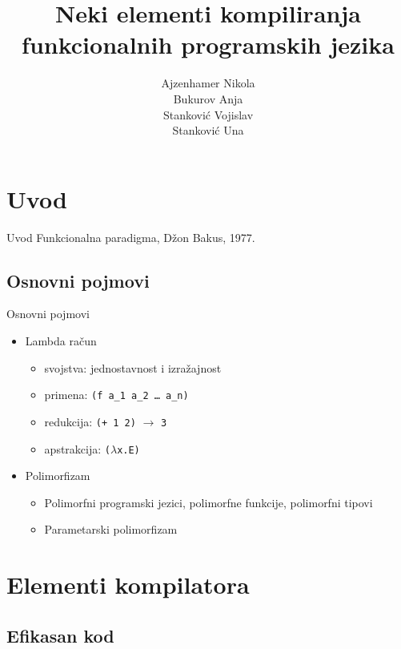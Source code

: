 \documentclass[xcolor={dvipsnames}, 11pt]{beamer}
\author{Ajzenhamer Nikola \\ Bukurov Anja \\ Stanković Vojislav \\ Stanković Una }
\title{Neki elementi kompiliranja funkcionalnih programskih jezika}
\begin{document}

\begin{frame}
	\titlepage
\end{frame}

\section{Uvod}

\begin{frame}{Uvod}
	Funkcionalna paradigma, Džon Bakus, 1977.\\
    \tableofcontents
\end{frame}

\subsection{Osnovni pojmovi}
	
\begin{frame}{Osnovni pojmovi}
	\begin{itemize}
    \item Lambda račun
    \begin{itemize}
    \item svojstva: jednostavnost i izražajnost
    \item primena: \texttt{(f a\_1 a\_2 \ldots\ a\_n)}
    \item redukcija: \texttt{(+ 1 2)} $\rightarrow$ \texttt{3}
    \item apstrakcija: \texttt{(}$\lambda$\texttt{x.E)}
    \end{itemize}
    \item Polimorfizam
    \begin{itemize}
    \item Polimorfni programski jezici, polimorfne funkcije, polimorfni tipovi
    \item Parametarski polimorfizam
    \end{itemize}
    \end{itemize}
\end{frame}
	
\section{Elementi kompilatora}

\subsection{Efikasan kod}
\end{document}
